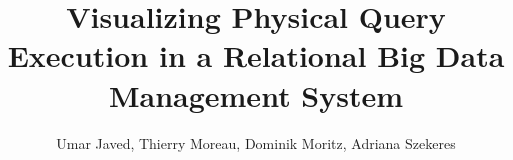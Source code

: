 \documentclass{article}
\begin{document}
\title{Visualizing Physical Query Execution in a Relational Big Data Management System}
\author{Umar Javed, Thierry Moreau, Dominik Moritz, Adriana Szekeres}

\maketitle







\end{document}
